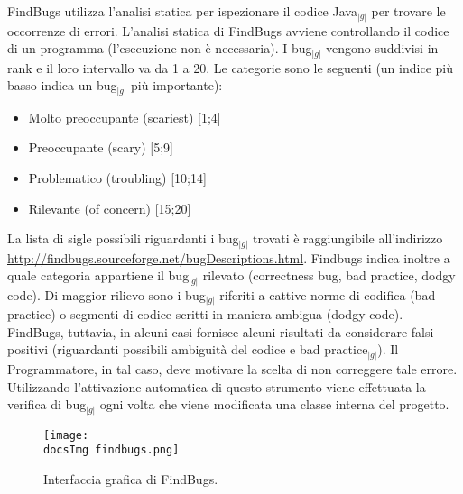{{{			FindBugs utilizza l'analisi statica per ispezionare il codice Java$_{|g|}$ per trovare le 
			occorrenze di errori. L'analisi statica di FindBugs avviene controllando il codice di un programma (l'esecuzione non è necessaria). I bug$_{|g|}$ vengono suddivisi in rank e il loro intervallo va da 1 a 20. Le 
			categorie sono le seguenti (un indice più basso indica un bug$_{|g|}$ più importante):
			\begin{itemize}
				\item Molto preoccupante (scariest) [1;4]
				\item Preoccupante (scary) [5;9]
				\item Problematico (troubling) [10;14]
				\item Rilevante (of concern) [15;20]
			\end{itemize}
			La lista di sigle possibili riguardanti i bug$_{|g|}$ trovati è raggiungibile all'indirizzo 	
			\url{http://findbugs.sourceforge.net/bugDescriptions.html}. 
			Findbugs indica inoltre a quale categoria appartiene il bug$_{|g|}$ rilevato (correctness bug, 
			bad practice\g , dodgy code). Di maggior rilievo sono i bug$_{|g|}$ riferiti a cattive norme di 
			codifica (bad practice\g ) o segmenti di codice scritti in maniera ambigua (dodgy code).
			FindBugs, tuttavia, in alcuni casi fornisce alcuni risultati da considerare falsi positivi 
			(riguardanti possibili ambiguità del codice e bad practice$_{|g|}$). Il Programmatore, in tal caso, deve 
			motivare la scelta di non correggere tale errore.
			Utilizzando l'attivazione automatica di questo strumento viene effettuata la 
			verifica di bug$_{|g|}$ ogni volta che viene modificata una classe interna del progetto.
			\begin{center}
				\begin{figure}[h]
					\centering
					\texttt{[image: \\docsImg findbugs.png]}
					\caption{Interfaccia grafica di FindBugs.}	
				\end{figure}
			\end{center}		
		}			

}}
